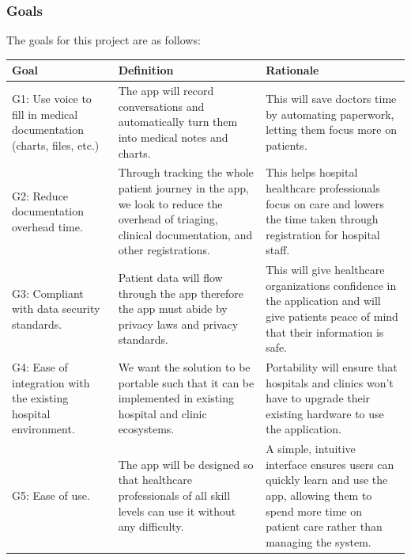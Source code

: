 \documentclass[12pt]{article}
\begin{document}
\subsubsection{Goals}
The goals for this project are as follows:
\begin{table}[H]
    \centering
    \begin{tabular}{p{4cm} p{4cm} p{4cm}}
        \toprule
        \textbf{Goal} & \textbf{Definition} & \textbf{Rationale} \\
        \midrule
        G1: Use voice to fill in medical documentation (charts, files, etc.) & The app will record conversations and automatically turn them into medical notes and charts. & This will save doctors time by automating paperwork, letting them focus more on patients. \\
        \midrule
        G2: Reduce documentation overhead time.  & Through tracking the whole patient journey in the app, we look to reduce the overhead of triaging, clinical documentation, and other registrations.  & This helps hospital healthcare professionals focus on care and lowers the time taken through registration for hospital staff. \\ 
        \midrule
        G3: Compliant with data security standards.  & Patient data will flow through the app therefore the app must abide by privacy laws and privacy standards. & This will give healthcare organizations confidence in the application and will give patients peace of mind that their information is safe. \\
        \midrule 
        G4: Ease of integration with the existing hospital environment. & We want the solution to be portable such that it can be implemented in existing hospital and clinic ecosystems.  & Portability will ensure that hospitals and clinics won’t have to upgrade their existing hardware to use the application. \\
        \midrule 
        G5: Ease of use. & The app will be designed so that healthcare professionals of all skill levels can use it without any difficulty. & A simple, intuitive interface ensures users can quickly learn and use the app, allowing them to spend more time on patient care rather than managing the system. \\
        \bottomrule
    \end{tabular}
\end{table}
\end{document}

